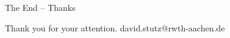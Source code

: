 \documentclass[handout]{beamer}
\begin{document}
	\begin{frame}{The End -- Thanks}
		\begin{center}
			{\LARGE Thank you for your attention.}
			\vskip 0.25cm
			{\large david.stutz@rwth-aachen.de}
		\end{center}
		\vspace{-0.5cm}
		
		\begin{figure}
\end{figure}
\end{frame}
\end{document}
